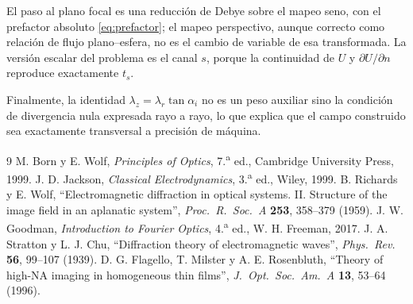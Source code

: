 \documentclass[11pt,a4paper]{article}
\begin{document}
El paso al plano focal es una reducción de Debye sobre el mapeo seno, con el
prefactor absoluto \eqref{eq:prefactor}; el mapeo perspectivo, aunque correcto
como relación de flujo plano--esfera, no es el cambio de variable de esa
transformada. La versión escalar del problema es el canal $s$, porque la
continuidad de $U$ y $\partial U/\partial n$ reproduce exactamente $t_s$.

Finalmente, la identidad $\lambda_z=\lambda_r\tan\alpha_i$ no es un peso
auxiliar sino la condición de divergencia nula expresada rayo a rayo, lo que
explica que el campo construido sea exactamente transversal a precisión de
máquina.

\begin{thebibliography}{9}
 M. Born y E. Wolf, \emph{Principles of Optics}, 7.\textsuperscript{a} ed., Cambridge University Press, 1999.
 J. D. Jackson, \emph{Classical Electrodynamics}, 3.\textsuperscript{a} ed., Wiley, 1999.
 B. Richards y E. Wolf, ``Electromagnetic diffraction in optical systems. II. Structure of the image field in an aplanatic system'', \emph{Proc.\ R.\ Soc.\ A} \textbf{253}, 358--379 (1959).
 J. W. Goodman, \emph{Introduction to Fourier Optics}, 4.\textsuperscript{a} ed., W. H. Freeman, 2017.
 J. A. Stratton y L. J. Chu, ``Diffraction theory of electromagnetic waves'', \emph{Phys.\ Rev.} \textbf{56}, 99--107 (1939).
 D. G. Flagello, T. Milster y A. E. Rosenbluth, ``Theory of high-NA imaging in homogeneous thin films'', \emph{J.\ Opt.\ Soc.\ Am.\ A} \textbf{13}, 53--64 (1996).
\end{thebibliography}
\end{document}
